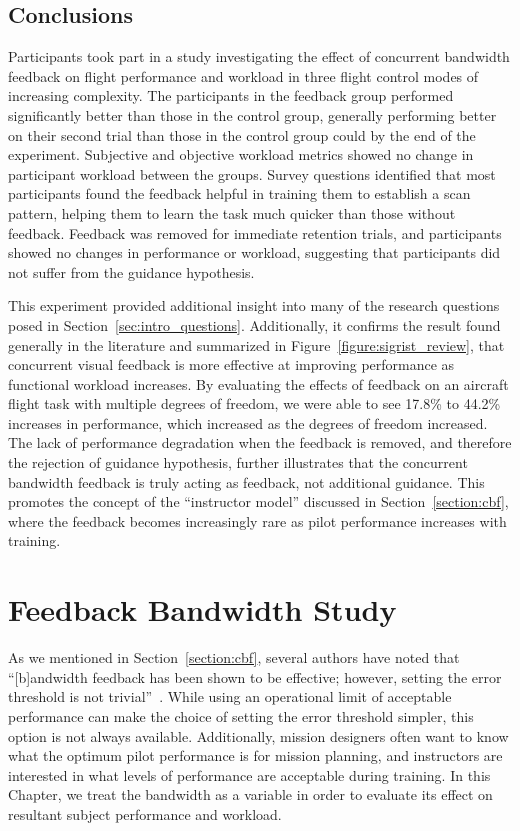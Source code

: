 \section{Conclusions}
Participants took part in a study investigating the effect of concurrent bandwidth feedback on flight performance and workload in three flight control modes of increasing complexity.
The participants in the feedback group performed significantly better than those in the control group, generally performing better on their second trial than those in the control group could by the end of the experiment.
Subjective and objective workload metrics showed no change in participant workload between the groups.
Survey questions identified that most participants found the feedback helpful in training them to establish a scan pattern, helping them to learn the task much quicker than those without feedback.
Feedback was removed for immediate retention trials, and participants showed no changes in performance or workload, suggesting that participants did not suffer from the guidance hypothesis.

This experiment provided additional insight into many of the research questions posed in Section~\ref{sec:intro_questions}.
Additionally, it confirms the result found generally in the literature and summarized in Figure~\ref{figure:sigrist_review}, that concurrent visual feedback is more effective at improving performance as functional workload increases.
By evaluating the effects of feedback on an aircraft flight task with multiple degrees of freedom, we were able to see 17.8\% to 44.2\% increases in performance, which increased as the degrees of freedom increased.
The lack of performance degradation when the feedback is removed, and therefore the rejection of guidance hypothesis, further illustrates that the concurrent bandwidth feedback is truly acting as feedback, not additional guidance.
This promotes the concept of the ``instructor model'' discussed in Section~\ref{section:cbf}, where the feedback becomes increasingly rare as pilot performance increases with training.

\chapter{Feedback Bandwidth Study}
\label{chapter:bandwidthstudy}

As we mentioned in Section~\ref{section:cbf}, several authors have noted that ``[b]andwidth feedback has been shown to be effective; however, setting the error threshold is not trivial''~\citep{timmermans_technology-assisted_2009, RIBEIRO2011231, sigrist_augmented_2013}.
While using an operational limit of acceptable performance can make the choice of setting the error threshold simpler, this option is not always available.
Additionally, mission designers often want to know what the optimum pilot performance is for mission planning, and instructors are interested in what levels of performance are acceptable during training.
In this Chapter, we treat the bandwidth as a variable in order to evaluate its effect on resultant subject performance and workload.

